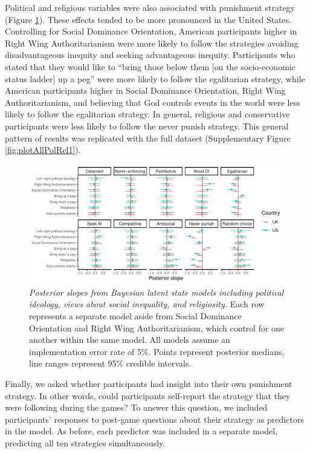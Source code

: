 \documentclass[
  man,floatsintext]{apa6}
\begin{document}
Political and religious variables were also associated with punishment strategy
(Figure \ref{fig:plotAllPolRel2}). These effects tended to be more pronounced
in the United States. Controlling for Social Dominance Orientation, American
participants higher in Right Wing Authoritarianism were more likely to follow
the strategies avoiding disadvantageous inequity and seeking advantageous
inequity. Participants who stated that they would like to ``bring those below
them {[}on the socio-economic status ladder{]} up a peg'' were more likely to follow
the egalitarian strategy, while American participants higher in Social Dominance
Orientation, Right Wing Authoritarianism, and believing that God controls events
in the world were less likely to follow the egalitarian strategy. In general,
religious and conservative participants were less likely to follow the never
punish strategy. This general pattern of results was replicated with the full
dataset (Supplementary Figure \ref{fig:plotAllPolRel1}).








\begin{figure}
\centering
\includegraphics{manuscript_files/figure-latex/plotAllPolRel2-1.pdf}
\caption{\label{fig:plotAllPolRel2}\emph{Posterior slopes from Bayesian latent state models
including political ideology, views about social inequality, and religiosity.}
Each row represents a separate model aside from Social Dominance Orientation and
Right Wing Authoritarianism, which control for one another within the same
model. All models assume an implementation error rate of 5\%. Points represent
posterior medians, line ranges represent 95\% credible intervals.}
\end{figure}

Finally, we asked whether participants had insight into their own punishment
strategy. In other words, could participants self-report the strategy that they
were following during the games? To answer this question, we included
participants' responses to post-game questions about their strategy as
predictors in the model. As before, each predictor was included in a separate
model, predicting all ten strategies simultaneously.
\end{document}
